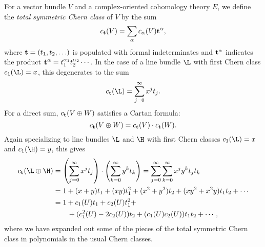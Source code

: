\begin{remark}
For a vector bundle \(V\) and a complex-oriented cohomology theory \(E\), we define the \textit{total symmetric Chern class} of \(V\) by the sum \[c_{\mathbf t}(V) = \sum_\alpha c_\alpha(V) \mathbf t^{\alpha},\] where \(\mathbf t = (t_1, t_2, \ldots)\) is populated with formal indeterminates and \(\mathbf t^{\alpha}\) indicates the product \(\mathbf t^{\alpha} = t_1^{\alpha_1} t_2^{\alpha_2} \cdots\).  In the case of a line bundle \(\L\) with first Chern class \(c_1(\L) = x\), this degenerates to the sum \[c_{\t}(\L) = \sum_{j=0}^\infty x^j t_j.\]  For a direct sum, \(c_{\mathbf t}(V \oplus W)\) satisfies a Cartan formula: \[c_{\mathbf t}(V \oplus W) = c_{\mathbf t}(V) \cdot c_{\mathbf t}(W).\]  Again specializing to line bundles \(\L\) and \(\H\) with first Chern classes \(c_1(\L) = x\) and \(c_1(\H) = y\), this gives
\begin{align*}
c_{\t}(\L \oplus \H) & = \left( \sum_{j=0}^\infty x^j t_j \right) \cdot \left( \sum_{k=0}^\infty y^k t_k \right) = \sum_{j = 0}^{\infty} \sum_{k=0}^\infty x^j y^k t_j t_k \\
& = 1 + (x + y)t_1 + (xy)t_1^2 + (x^2 + y^2)t_2 + (xy^2 + x^2y)t_1 t_2 + \cdots \\
& = 1 + c_1(U)t_1 + c_2(U)t_1^2 + \\
& \quad \quad + (c_1^2(U) - 2c_2(U))t_2 + (c_1(U) c_2(U))t_1t_2 + \cdots,
\end{align*}
where we have expanded out some of the pieces of the total symmetric Chern class in polynomials in the usual Chern classes.
\end{remark}

